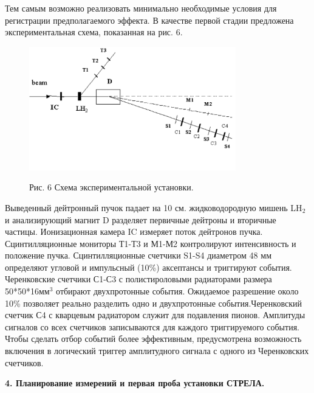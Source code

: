 \documentclass[a4paper,12pt]{article}
\begin{document}
{{        Тем самым возможно реализовать минимально необходимые условия
        для регистрации предполагаемого эффекта.
        В качестве первой стадии предложена экспериментальная схема,
        показанная на рис. 6.

        \begin{figure}[hbt]
          \begin{center}
            \includegraphics[width=9cm]{image2.pdf}
          \end{center}
          \vspace{0.4mm}
          Рис. 6 Схема экспериментальной установки. \\
        \end{figure}

        Выведенный дейтронный пучок падает на 10 см. жидководородную
        мишень LH$_2$ и анализирующий магнит D разделяет первичные
        дейтроны и вторичные частицы. Иони\-зационная камера IC измеряет
        поток дейтро\-нов пучка. Сцин\-тилляционные мониторы Т1-Т3 и М1-М2
        контролируют интенсивность и положение пучка.
        Сцинтилляционные счетчики S1-S4 диаметром 48 мм определяют
        угловой и импульсный (10\%) аксептансы и триггируют события.
        Черенковские счетчики С1-С3 с полистироловыми радиаторами
        размера 50*50*16мм$^3$ отбирают двухпротонные события.
        Ожидаемое разрешение около 10\% позволяет реально разделить
        одно и двухпротонные события.Черенковский счетчик С4 с кварцевым
        радиато\-ром служит для подавления пионов. Амплитуды сигналов со всех
        счетчиков записываются для каждого триггируемого события. Чтобы
        сделать отбор событий более эффективным, предусмотрена возможность
        вклю\-чения в логический триггер амплитудного сигнала с одного
        из Черенков\-ских счетчиков.

        \vspace {10mm}

        {\Large\bf 4. Планирование измерений и первая проба
          установки СТРЕЛА.}

}}
\end{document}
